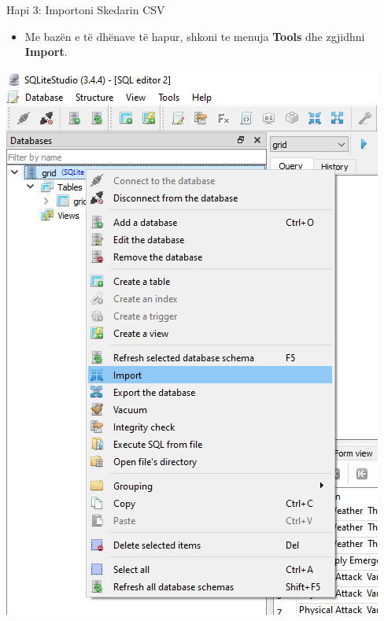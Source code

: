 \documentclass[
  ignorenonframetext,
]{beamer}
\providecommand{\tightlist}{%
  \setlength{\itemsep}{0pt}\setlength{\parskip}{0pt}}
\begin{document}
\begin{frame}{Hapi 3: Importoni Skedarin CSV}
\label{hapi-3-importoni-skedarin-csv}
\begin{itemize}
\tightlist
\item
  Me bazën e të dhënave të hapur, shkoni te menuja \textbf{Tools} dhe
  zgjidhni \textbf{Import}.
\end{itemize}

\includegraphics{./Figs/sql10.png}
\end{frame}
\end{document}
